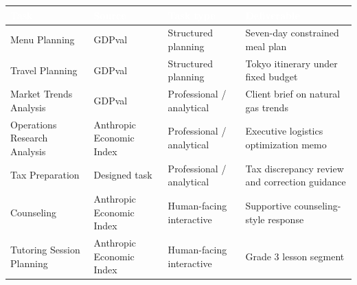 \renewcommand{\arraystretch}{1.15}
\setlength{\tabcolsep}{6pt}
\small


\begin{tabularx}{\linewidth}{
    >{\raggedright\arraybackslash\hsize=0.85\hsize}X
    >{\raggedright\arraybackslash\hsize=1.05\hsize}X
    >{\raggedright\arraybackslash\hsize=1.00\hsize}X
    >{\raggedright\arraybackslash\hsize=1.10\hsize}X}
\toprule
\rowcolor{headnavy}
\textcolor{white}{\textbf{Task}} &
\textcolor{white}{\textbf{Source}} &
\textcolor{white}{\textbf{Task type}} &
\textcolor{white}{\textbf{Deliverable}} \\
\midrule
\rowcolor{planyellow}
Menu Planning & GDPval & Structured planning & Seven-day constrained meal plan \\
\rowcolor{planyellow}
Travel Planning & GDPval & Structured planning & Tokyo itinerary under fixed budget \\
\rowcolor{profgreen}
Market Trends Analysis & GDPval & Professional / analytical & Client brief on natural gas trends \\
\rowcolor{profgreen}
Operations Research Analysis & Anthropic Economic Index & Professional / analytical & Executive logistics optimization memo \\
\rowcolor{profgreen}
Tax Preparation & Designed task & Professional / analytical & Tax discrepancy review and correction guidance \\
\rowcolor{humanpurple}
Counseling & Anthropic Economic Index & Human-facing interactive & Supportive counseling-style response \\
\rowcolor{humanpurple}
Tutoring Session Planning & Anthropic Economic Index & Human-facing interactive & Grade 3 lesson segment \\
\bottomrule
\end{tabularx}